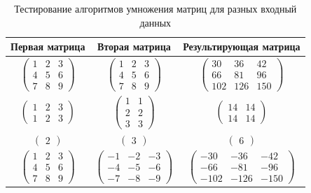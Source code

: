 \documentclass[a4paper,14pt, unknownkeysallowed]{extreport}
\begin{document}
\begin{table}[h!]
	\begin{center}
    \captionsetup{justification=raggedright,singlelinecheck=off}
		\caption{\label{tbl:test} Тестирование алгоритмов умножения матриц для разных входный данных}
		\begin{tabular}{|c|c|c|}
			\hline
				Первая матрица & Вторая матрица & Результирующая матрица \\ 
			\hline
			$\begin{pmatrix}
			1 & 2 & 3\\
			4 & 5 & 6\\
			7 & 8 & 9
			\end{pmatrix}$ &
			$\begin{pmatrix}
			1 & 2 & 3\\
			4 & 5 & 6\\
			7 & 8 & 9
			\end{pmatrix}$ &
			$\begin{pmatrix}
			30 & 36 & 42\\
			66 & 81 & 96\\
			102 & 126 & 150
			\end{pmatrix}$ \\\hline
			$\begin{pmatrix}
			1 & 2 & 3\\
			1 & 2 & 3
			\end{pmatrix}$ &
			$\begin{pmatrix}
			1 & 1\\
			2 & 2\\
			3 & 3
			\end{pmatrix}$ &
			$\begin{pmatrix}
			14 & 14\\
			14 & 14
			\end{pmatrix}$ \\\hline
			$\begin{pmatrix}
			2
			\end{pmatrix}$ &
			$\begin{pmatrix}
			3
			\end{pmatrix}$ &
			$\begin{pmatrix}
			6
			\end{pmatrix}$ \\\hline
			$\begin{pmatrix}
			1 & 2 & 3\\
			4 & 5 & 6\\
			7 & 8 & 9
			\end{pmatrix}$ &
			$\begin{pmatrix}
			-1 & -2 & -3\\
			-4 & -5 & -6\\
			-7 & -8 & -9
			\end{pmatrix}$ &
			$\begin{pmatrix}
			-30 & -36 & -42\\
			-66 & -81 & -96\\
			-102 & -126 & -150
		\end{pmatrix}$\\\hline
		\end{tabular}			
	\end{center}
\end{table}
\end{document}
